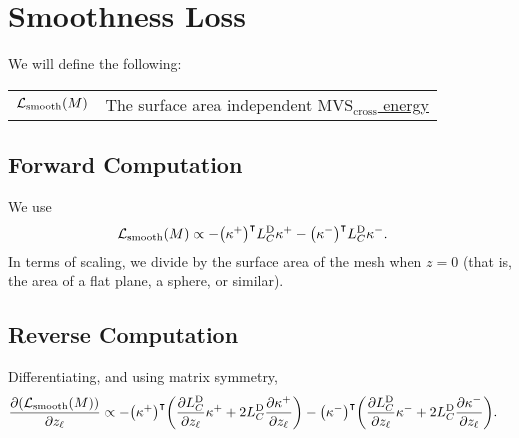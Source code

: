

\section{Smoothness Loss}

We will define the following: \begin{center}\begin{tabular}{r|l}
	\(\mathcal{L}_{\mathrm{smooth}}\pof{M}\) & The surface area independent \href{http://graphics.berkeley.edu/papers/Joshi-EMC-2007-06/Joshi-EMC-2007-06.pdf}{\(\text{MVS}_{\text{cross}}\) energy}
\end{tabular}\end{center}

\subsection{Forward Computation}
We use \begin{align*}
	\mathcal{L}_{\mathrm{smooth}}\pof{M} &\propto -\pof{\kappa^+}^\intercal L_C^{\text{D}}\kappa^+ - \pof{\kappa^-}^\intercal L_C^{\text{D}}\kappa^-.
\end{align*} In terms of scaling, we divide by the surface area of the mesh when \(z = 0\) (that is, the area of a flat plane, a sphere, or similar).

\subsection{Reverse Computation}
Differentiating, and using matrix symmetry, \begin{align*}
	\frac{\partial\pof{\mathcal{L}_{\mathrm{smooth}}\pof{M}}}{\partial z_\ell} &\propto -\pof{\kappa^+}^\intercal\pof{\frac{\partial L_C^{\text{D}}}{\partial z_\ell}\kappa^+ + 2L_C^{\text{D}}\frac{\partial\kappa^+}{\partial z_\ell}} - \pof{\kappa^-}^\intercal\pof{\frac{\partial L_C^{\text{D}}}{\partial z_\ell}\kappa^- + 2L_C^{\text{D}}\frac{\partial\kappa^-}{\partial z_\ell}}.
\end{align*}
